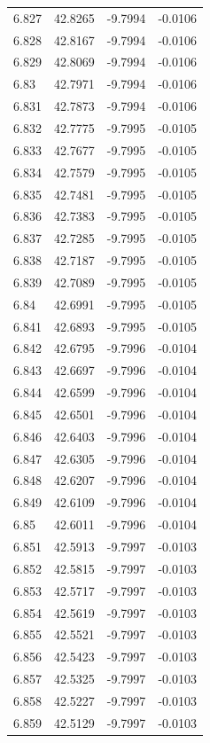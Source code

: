 \begin{tabular}{llll}
6.827 & 42.8265 & -9.7994 & -0.0106 \\
6.828 & 42.8167 & -9.7994 & -0.0106 \\
6.829 & 42.8069 & -9.7994 & -0.0106 \\
6.83 & 42.7971 & -9.7994 & -0.0106 \\
6.831 & 42.7873 & -9.7994 & -0.0106 \\
6.832 & 42.7775 & -9.7995 & -0.0105 \\
6.833 & 42.7677 & -9.7995 & -0.0105 \\
6.834 & 42.7579 & -9.7995 & -0.0105 \\
6.835 & 42.7481 & -9.7995 & -0.0105 \\
6.836 & 42.7383 & -9.7995 & -0.0105 \\
6.837 & 42.7285 & -9.7995 & -0.0105 \\
6.838 & 42.7187 & -9.7995 & -0.0105 \\
6.839 & 42.7089 & -9.7995 & -0.0105 \\
6.84 & 42.6991 & -9.7995 & -0.0105 \\
6.841 & 42.6893 & -9.7995 & -0.0105 \\
6.842 & 42.6795 & -9.7996 & -0.0104 \\
6.843 & 42.6697 & -9.7996 & -0.0104 \\
6.844 & 42.6599 & -9.7996 & -0.0104 \\
6.845 & 42.6501 & -9.7996 & -0.0104 \\
6.846 & 42.6403 & -9.7996 & -0.0104 \\
6.847 & 42.6305 & -9.7996 & -0.0104 \\
6.848 & 42.6207 & -9.7996 & -0.0104 \\
6.849 & 42.6109 & -9.7996 & -0.0104 \\
6.85 & 42.6011 & -9.7996 & -0.0104 \\
6.851 & 42.5913 & -9.7997 & -0.0103 \\
6.852 & 42.5815 & -9.7997 & -0.0103 \\
6.853 & 42.5717 & -9.7997 & -0.0103 \\
6.854 & 42.5619 & -9.7997 & -0.0103 \\
6.855 & 42.5521 & -9.7997 & -0.0103 \\
6.856 & 42.5423 & -9.7997 & -0.0103 \\
6.857 & 42.5325 & -9.7997 & -0.0103 \\
6.858 & 42.5227 & -9.7997 & -0.0103 \\
6.859 & 42.5129 & -9.7997 & -0.0103 \\

\end{tabular}
